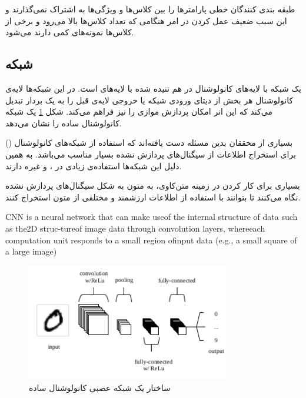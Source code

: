 \documentclass[12pt, a4paper, oneside]{report}
\begin{document}
طبقه بندی کنندگان خطی پارامترها را بین کلاس‌ها و ویژگی‌ها به اشتراک نمی‌گذارند و این سبب ضعیف عمل
کردن در امر
هنگامی که تعداد کلاس‌ها بالا می‌رود و برخی از کلاس‌ها نمونه‌های کمی دارند می‌شود.

\subsection{شبکه }

یک شبکه
با لایه‌های کانولوشنال در هم تنیده شده با لایه‌های
است. در این شبکه‌ها لایه‌ی کانولوشنال هر بخش از دیتای ورودی شبکه یا خروجی لایه‌ی قبل را به یک بردار 
تبدیل می‌کند که این انر امکان پردازش موازی را نیز فراهم می‌کند\cite{iyyer-etal-2015-deep}. شکل
\ref{fig:cnn}
یک شبکه کانولوشنال ساده را نشان می‌دهد.

بسیاری از محققان بدین مسئله دست یافته‌اند که استفاده از شبکه‌های کانولوشنال
()
برای استخراج اطلاعات از سیگنال‌های پردازش نشده بسیار مناسب می‌باشد. به همین دلیل این شبکه‌ها
استفاده‌ی زیادی در
،
و غیره دارند\cite{c9d4fbeac7324056bed5d1cb262a7268}.

بسیاری برای کار کردن در زمینه متن‌کاوی، به متون به شکل سیگنال‌های پردازش نشده نگاه می‌کنند
تا بتوانند با استفاده از
اطلاعات ارزشمند و مختلفی از متون استخراج کنند\cite{c9d4fbeac7324056bed5d1cb262a7268}.

CNN is a neural network that can make useof the internal structure of data 
such as the2D struc-tureof image data through convolution layers, whereeach 
computation unit responds to a small region ofinput  data  (e.g.,  a  small  
square  of  a  large  image)
\cite{johnson-zhang-2015-effective}

\begin{figure}[h]
    \centering
    \includegraphics[width=0.80\textwidth]{CNN}
    \caption{ساختار یک شبکه عصبی کانولوشنال ساده}
    \label{fig:cnn}
\end{figure}
\end{document}
